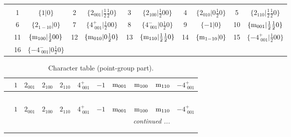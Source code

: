 \documentclass[fleqn,10pt,landscape]{article}
\begin{document}
\begin{itemize}
\begin{center}
\begin{longtable}{c|cc|cc|cc|cc|cc}
 \hline \hline
\multicolumn{10}{r}{} \\ \endlastfoot

 & 1 & $\{1|0\}$ & 2 & $\{2{}_{001}|\frac{1}{2} \frac{1}{2} 0\}$ & 3 & $\{2{}_{100}|\frac{1}{2} 0 0\}$ & 4 & $\{2{}_{010}|0 \frac{1}{2} 0\}$ & 5 & $\{2{}_{110}|\frac{1}{2} \frac{1}{2} 0\}$ \\
& 6 & $\{2{}_{1-10}|0\}$ & 7 & $\{4^{+}_{\,\,001}|\frac{1}{2} 0 0\}$ & 8 & $\{4^{-}_{\,\,001}|0 \frac{1}{2} 0\}$ & 9 & $\{-1|0\}$ & 10 & $\{{\rm m}_{001}|\frac{1}{2} \frac{1}{2} 0\}$ \\
& 11 & $\{{\rm m}_{100}|\frac{1}{2} 0 0\}$ & 12 & $\{{\rm m}_{010}|0 \frac{1}{2} 0\}$ & 13 & $\{{\rm m}_{110}|\frac{1}{2} \frac{1}{2} 0\}$ & 14 & $\{{\rm m}_{1-10}|0\}$ & 15 & $\{-4^{+}_{\,\,001}|\frac{1}{2} 0 0\}$ \\
& 16 & $\{-4^{-}_{\,\,001}|0 \frac{1}{2} 0\}$ &  &  &  &  &  &  &  &  \\
\end{longtable}
\end{center}
\begin{center}
\renewcommand{\arraystretch}{1.0}
\begin{longtable}{c|rrrrrrrrrr}
\caption{Character table (point-group part).}
 \\
 \hline \hline
 & $ 1 $ & $ 2{}_{001} $ & $ 2{}_{100} $ & $ 2{}_{110} $ & $ 4^{+}_{\,\,001} $ & $ -1 $ & $ {\rm m}_{001} $ & $ {\rm m}_{100} $ & $ {\rm m}_{110} $ & $ -4^{+}_{\,\,001} $ \\ \hline \endfirsthead

\multicolumn{10}{l}{\tablename\ \thetable{}} \\
 \hline \hline
 & $ 1 $ & $ 2{}_{001} $ & $ 2{}_{100} $ & $ 2{}_{110} $ & $ 4^{+}_{\,\,001} $ & $ -1 $ & $ {\rm m}_{001} $ & $ {\rm m}_{100} $ & $ {\rm m}_{110} $ & $ -4^{+}_{\,\,001} $ \\ \hline \endhead

 \hline \hline
\multicolumn{10}{r}{\footnotesize\it continued ...} \\ \endfoot

 \hline \hline
\multicolumn{10}{r}{} \\ \endlastfoot


\end{longtable}
\end{center}
\end{itemize}
\end{document}
